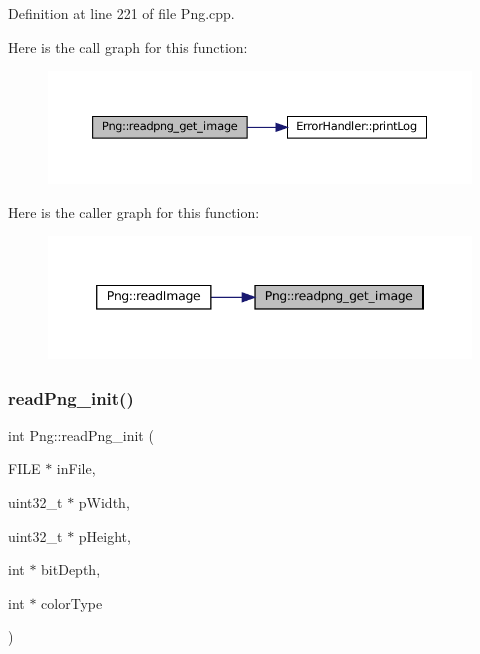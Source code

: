 Definition at line 221 of file Png.\+cpp.

Here is the call graph for this function\+:\nopagebreak
\begin{figure}[H]
\begin{center}
\leavevmode
\includegraphics[width=350pt]{classPng_a2a1a70412369c257a8d56c54753d7d43_cgraph}
\end{center}
\end{figure}
Here is the caller graph for this function\+:\nopagebreak
\begin{figure}[H]
\begin{center}
\leavevmode
\includegraphics[width=346pt]{classPng_a2a1a70412369c257a8d56c54753d7d43_icgraph}
\end{center}
\end{figure}
\mbox{\label{classPng_a54cee101f15423f12d822cb369bcda42}} 
\subsubsection{\texorpdfstring{readPng\_init()}{readPng\_init()}}
{\footnotesize\ttfamily int Png\+::read\+Png\+\_\+init (\begin{DoxyParamCaption}\item[{F\+I\+LE $\ast$}]{in\+File,  }\item[{uint32\+\_\+t $\ast$}]{p\+Width,  }\item[{uint32\+\_\+t $\ast$}]{p\+Height,  }\item[{int $\ast$}]{bit\+Depth,  }\item[{int $\ast$}]{color\+Type }\end{DoxyParamCaption})\hspace{0.3cm}{\ttfamily [private]}}



